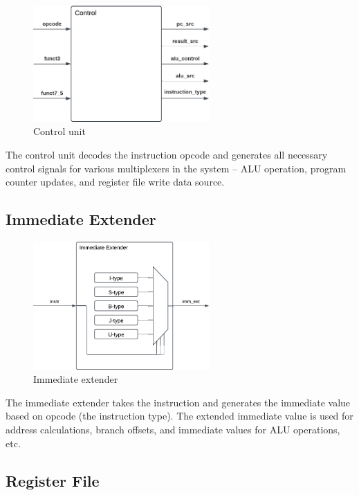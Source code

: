 \begin{figure}[H]
    \centering
    \includegraphics[width=0.6\textwidth]{media/control}
    \caption{Control unit}
    \label{fig:control}
\end{figure}

The control unit decodes the instruction opcode and generates all necessary control signals for various multiplexers in the system -- ALU operation, program counter updates, and register file write data source.

\subsection{Immediate Extender}

\begin{figure}[H]
    \centering
    \includegraphics[width=0.6\textwidth]{media/imm_extender}
    \caption{Immediate extender}
    \label{fig:immgen}
\end{figure}

The immediate extender takes the instruction and generates the immediate value based on opcode (the instruction type).
The extended immediate value is used for address calculations, branch offsets, and immediate values for ALU operations, etc.

\subsection{Register File}


